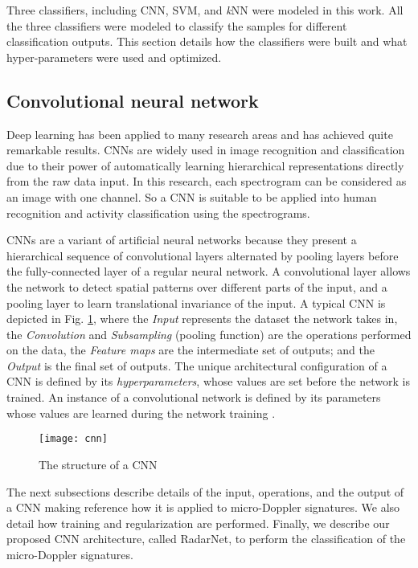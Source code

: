 Three classifiers, including CNN, SVM, and \textit{k}NN were modeled in this work. All the three classifiers were modeled to classify the samples for different classification outputs. This section details how the classifiers were built and what hyper-parameters were used and optimized.
\subsection{Convolutional neural network}
Deep learning has been applied to many research areas and has achieved quite remarkable results. CNNs are widely used in image recognition and classification due to their power of automatically learning hierarchical representations directly from the raw data input. In this research, each spectrogram can be considered as an image with one channel. So a CNN is suitable to be applied into human recognition and activity classification using the spectrograms.

CNNs are a variant of artificial neural networks because they present a hierarchical sequence of convolutional layers alternated by pooling layers before the fully-connected layer of a regular neural network. A convolutional layer allows the network to detect spatial patterns over different parts of the input, and a pooling layer to learn translational invariance of the input. A typical CNN is depicted in Fig. \ref{fig_cnn}, where the \textit{Input} represents the dataset the network takes in, the \textit{Convolution} and \textit{Subsampling} (pooling function) are the operations performed on the data, the \textit{Feature maps} are the intermediate set of outputs; and the \textit{Output} is the final set of outputs. The unique architectural configuration of a CNN is defined by its \textit{hyperparameters}, whose values are set before the network is trained. An instance of a convolutional network is defined by its parameters whose values are learned during the network training \cite{bergado2018recurrent}.
\begin{figure}[!t]
\centering
\texttt{[image: cnn]}
\caption{The structure of a CNN}
\label{fig_cnn}
\end{figure}

The next subsections describe details of the input, operations, and the output of a CNN making reference how it is applied to micro-Doppler signatures. We also detail how training and regularization are performed. Finally, we describe our proposed CNN architecture, called RadarNet, to perform the classification of the micro-Doppler signatures.
